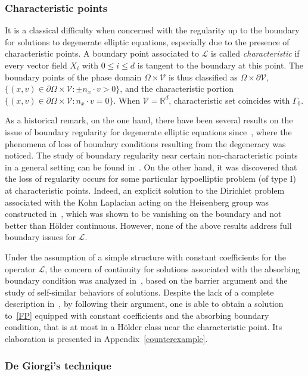 \documentclass[AHL,Unicode,longabstracts,published]{cedram}
\newcommand*\p{\partial}
\newcommand*\R {\mathbb{R}}
\newcommand*\V {\mathcal{V}}
\newcommand{\scL}{\mathscr{L}}
\begin{document}
\subsubsection{Characteristic points}\label{chara}


It is a classical difficulty when concerned with the regularity up to the boundary for solutions to degenerate elliptic equations, especially due to the presence of characteristic points. A boundary point associated to $\scL$ is called \emph{characteristic} if every vector field $X_i$ with $0\le i\le d$ is tangent to the boundary at this point. The boundary points of the phase domain $\Omega\times\V$ is thus classified as $\Omega\times\p\V$, $\{(x,v)\in\p\Omega\times\V:\pm n_x\cdot v>0\}$, and the characteristic portion $\{(x,v)\in\p\Omega\times\V:n_x\cdot v=0\}$. When $\V=\R^d$, characteristic set coincides with $\Gamma_0$.

As a historical remark, on the one hand, there have been several results on the issue of boundary regularity for degenerate elliptic equations since~\cite{Fichera1,Keld}, where the phenomena of loss of boundary conditions resulting from the degeneracy was noticed. The study of boundary regularity near certain non-characteristic points in a general setting can be found in~\cite{KN1,Oleinik2}. On the other hand, it was discovered that the loss of regularity occurs for some particular hypoelliptic problem (of type I) at characteristic points. Indeed, an explicit solution to the Dirichlet problem associated with the Kohn Laplacian acting on the Heisenberg group was constructed in~\cite{Jerison}, which was shown to be vanishing on the boundary and not better than H\"older continuous. However, none of the above results address full boundary issues for $\scL$.

Under the assumption of a simple structure with constant coefficients for the operator $\scL$, the concern of continuity for solutions associated with the absorbing boundary condition was analyzed in~\cite{HJV}, based on the barrier argument and the study of self-similar behaviors of solutions. Despite the lack of a complete description in~\cite{HJV}, by following their argument, one is able to obtain a solution to~\eqref{FP} equipped with constant coefficients and the absorbing boundary condition, that is at most in a H\"older class near the characteristic point. Its elaboration is presented in Appendix~\ref{counterexample}.

\subsubsection{De Giorgi's technique}\label{dg}
\end{document}
